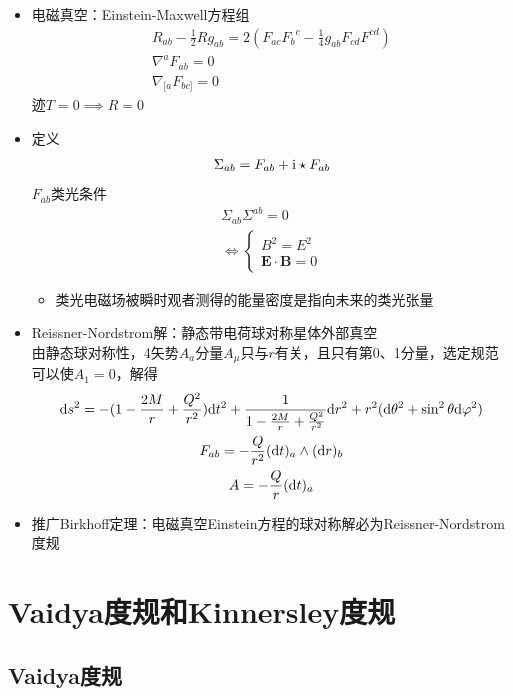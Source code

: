 \begin{itemize}
    \item 电磁真空：Einstein-Maxwell方程组
    \begin{gather*}
        R_{ab}-\frac{1}{2}Rg_{ab}=2(F_{ac}{F_b}^c-\frac{1}{4}g_{ab} F_{cd} F^{cd})
        \\
        \nabla^a F_{ab}=0
        \\
        \nabla_{[a} F_{bc]}=0
    \end{gather*}
    迹$T=0 \implies R=0$
    \item 定义
    \begin{gather*}
        \Sigma_{ab}=F_{ab}+\mathrm{i} \star F_{ab}
    \end{gather*}
    $F_{ab}$类光条件
    \begin{gather*}
        \Sigma_{ab} \Sigma^{ab}=0
        \\
        \iff \begin{cases}
            B^2=E^2
            \\
            \bm{E} \cdot \bm{B}=0
        \end{cases}
    \end{gather*}
    \begin{itemize}
        \item 类光电磁场被瞬时观者测得的能量密度是指向未来的类光张量
    \end{itemize}
    \item Reissner-Nordstrom解：静态带电荷球对称星体外部真空\\
    由静态球对称性，4矢势$A_a$分量$A_{\mu}$只与$r$有关，且只有第0、1分量，选定规范可以使$A_1=0$，解得
    \begin{gather*}
        \mathrm{d} s^2=-(1-\frac{2M}{r}+\frac{Q^2}{r^2}) \mathrm{d} t^2+\frac{1}{1-\frac{2M}{r}+\frac{Q^2}{r^2}} \mathrm{d} r^2+r^2(\mathrm{d} \theta^2 + \sin^2 \theta \mathrm{d} \varphi^2)
        \\
        F_{ab}=-\frac{Q}{r^2} (\mathrm{d} t)_a \wedge (\mathrm{d} r)_b
        \\
        A=-\frac{Q}{r} (\mathrm{d} t)_a
    \end{gather*}
    \item 推广Birkhoff定理：电磁真空Einstein方程的球对称解必为Reissner-Nordstrom度规
\end{itemize}

\section{Vaidya度规和Kinnersley度规}

\subsection{Vaidya度规}

